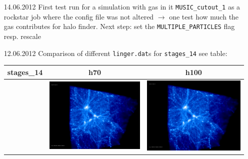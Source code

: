 \begin{itemize}
\item[14.06.2012]
First test run for a simulation with gas in it \texttt{MUSIC\_cutout\_1} 
as a rockstar job where the config file was not altered $\rightarrow$ 
one test how much the gas contributes for halo finder. Next step: 
set the \texttt{MULTIPLE\_PARTICLES} flag resp. rescale \\

\item[12.06.2012]
Comparison of different \texttt{linger.dat}s for \texttt{stages\_14} see table: \\

\begin{table}[p]
\centering
\begin{tabular}{l|c|c}
stages\_14 & h70 & h100 \\
\hline 
 & \includegraphics[scale=0.075]{r256/h100/stages_14/197.jpg} & \includegraphics[scale=0.075]{r256/h100/stages_14/197.jpg} \\

\end{tabular}
\end{table}
\end{itemize}

